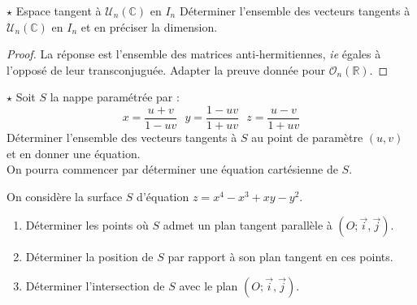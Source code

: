 \documentclass[french,a4paper]{article}
\newcommand{\R}{\mathbb{R}}
\newcommand{\C}{\mathbb{C}}
\theoremstyle{plain}
\theoremstyle{definition}
\theoremstyle{remark}
\begin{document}
\begin{ex}[Moulin.67]{$\star$ Espace tangent à $\mathcal{U}_n(\C)$ en $I_n$}
	Déterminer l'ensemble des vecteurs tangents à $\mathcal{U}_n(\C)$ en $I_n$ et en préciser la dimension.
\end{ex}
\begin{proof}
	La réponse est l'ensemble des matrices anti-hermitiennes, \textit{ie} égales à l'opposé de leur transconjuguée. Adapter la preuve donnée pour $\mathcal{O}_n(\R)$.
\end{proof}

\begin{ex}[Moulin.68]{$\star$}
	Soit $S$ la nappe paramétrée par : $$x=\frac{u+v}{1-uv}\ \ \ y=\frac{1-uv}{1+uv}\ \ \ z=\frac{u-v}{1+uv}$$ Déterminer l'ensemble des vecteurs tangents à $S$ au point de paramètre $(u,v)$ et en donner une équation. \\
	On pourra commencer par déterminer une équation cartésienne de $S$.
\end{ex}

\begin{ex}[Moulin.69]{}
	On considère la surface $S$ d'équation $z=x^4-x^3+xy-y^2$.
	\begin{enumerate}
		\item Déterminer les points où $S$ admet un plan tangent parallèle à $(O;\overrightarrow{i},\overrightarrow{j})$.
		\item Déterminer la position de $S$ par rapport à son plan tangent en ces points.
		\item Déterminer l'intersection de $S$ avec le plan $(O;\overrightarrow{i},\overrightarrow{j})$.
	\end{enumerate}
\end{ex}
\end{document}
